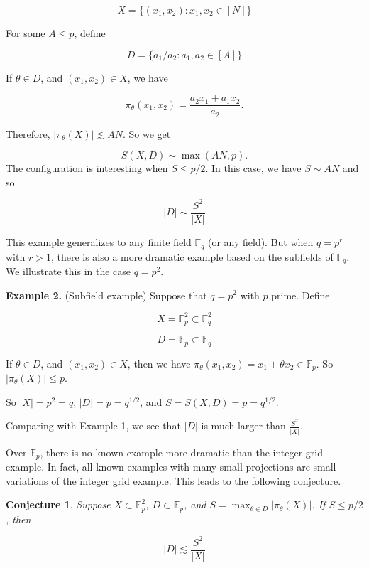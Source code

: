 \documentclass[12pt]{amsart}
\newtheorem{conj}[theorem]{Conjecture}
\newcommand{\FF}{\mathbb{F}}
\begin{document}
$$ X = \{ (x_1,x_2): x_1, x_2 \in [N] \}$$

\noindent For some $A \le p$, define

$$ D = \{ a_1/a_2: a_1, a_2 \in [A] \}$$

If $\theta \in D$, and $(x_1, x_2) \in X$, we have 

$$\pi_\theta(x_1, x_2) = \frac{ a_2 x_1 + a_1 x_2}{a_2}. $$

Therefore, $|\pi_\theta(X)| \lesssim A N$.  So we get

$$ S(X,D) \sim \max(AN, p).$$  The configuration is interesting when $S \le p/2$.  In this case, we have $S \sim AN$ and so

\begin{equation} \label{gridbound}
|D| \sim \frac{S^2}{|X|}
\end{equation}

This example generalizes to any finite field $\FF_q$ (or any field).  But when $q = p^r$ with $r>1$, there is also a more dramatic example based on the subfields of $\FF_q$.  We illustrate this in the case $q = p^2$.

\vskip10pt

{\bf Example 2.} (Subfield example) Suppose that $q=p^2$ with $p$ prime.  Define

$$ X = \FF_p^2 \subset \FF_q^2$$

$$ D = \FF_p \subset \FF_q$$

\noindent If $\theta \in D$, and $(x_1, x_2) \in X$, then we have $\pi_\theta(x_1,x_2) = x_1 + \theta x_2 \in \FF_p$.  So $|\pi_\theta(X)| \le p$.

So $|X| = p^2 = q$, $|D| = p = q^{1/2}$, and $S = S(X,D) = p = q^{1/2}$.

Comparing with Example 1, we see that $|D|$ is much larger than $\frac{S^2}{|X|}$.

\vskip10pt

Over $\FF_p$, there is no known example more dramatic than the integer grid example.  In fact, all known examples with many small projections are small variations of the integer grid example.  This leads to the following conjecture.

\vskip10pt

\begin{conj} Suppose $X \subset \FF_p^2$, $D \subset \FF_p$, and $S = \max_{\theta \in D} |\pi_\theta(X)|$.  If $S \le p/2$, then

$$ |D| \lesssim \frac{S^2}{|X|}$$
    
\end{conj}
\end{document}
